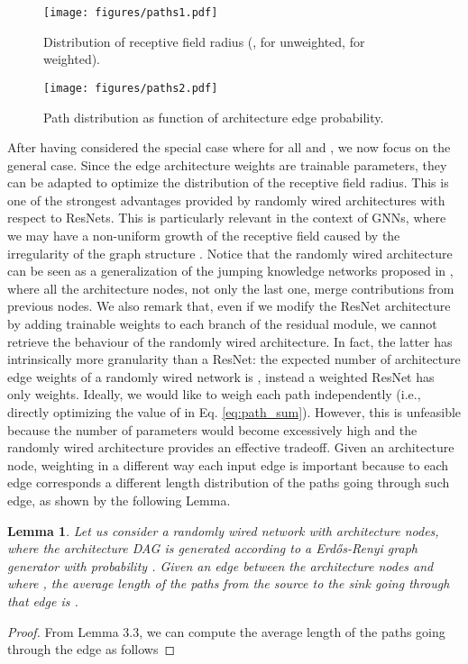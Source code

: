 \documentclass[10pt,twocolumn,twoside]{IEEEtran}
\newtheorem{lemma}[theorem]{Lemma}
\begin{document}
\begin{figure}[t]
    \centering
    \texttt{[image: figures/paths1.pdf]}
    \caption{Distribution of receptive field radius (,  for unweighted,  for weighted).}
    \label{fig:path1}
\end{figure}

\begin{figure}[t]
    \centering
    \texttt{[image: figures/paths2.pdf]}
    \caption{Path distribution as function of architecture edge probability.}
    \label{fig:path2}
\end{figure}

After having considered the special case where  for all  and , we now focus on the general case. Since the edge architecture weights are trainable parameters, they can be adapted to optimize the distribution of the receptive field radius. This is one of the strongest advantages provided by randomly wired architectures with respect to ResNets. This is particularly relevant in the context of GNNs, where we may have a non-uniform growth of the receptive field caused by the irregularity of the graph structure \cite{xu2018representation}. Notice that the randomly wired architecture can be seen as a generalization of the jumping knowledge networks proposed in \cite{xu2018representation}, where all the architecture nodes, not only the last one, merge contributions from previous nodes.
We also remark that, even if we modify the ResNet architecture by adding trainable weights to each branch of the residual module, we cannot retrieve the behaviour of the randomly wired architecture. In fact, the latter has intrinsically more granularity than a ResNet: the expected number of architecture edge weights of a randomly wired network is , instead a weighted ResNet has only  weights. Ideally, we would like to weigh each path independently (i.e., directly optimizing the value of  in Eq. \eqref{eq:path_sum}). However, this is unfeasible because the number of parameters would become excessively high and the randomly wired architecture provides an effective tradeoff. Given an architecture node, weighting in a different way each input edge is important because to each edge corresponds a different length distribution of the paths going through such edge, as shown by the following Lemma. 

\begin{lemma}
Let us consider a randomly wired network with  architecture nodes, where the architecture DAG is generated according to a Erd\H{o}s-Renyi graph generator with probability . Given an edge  between the architecture nodes  and  where , the average length of the paths from the source to the sink going through that edge is .
\end{lemma}
\begin{proof}
From Lemma 3.3, we can compute the average length of the paths going through the edge  as follows

\end{proof}
\end{document}
